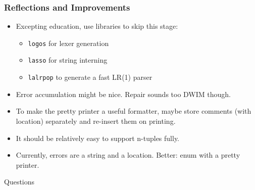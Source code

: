 \documentclass{beamer}
\begin{document}
\begin{frame}
    \frametitle{Reflections and Improvements}
    \begin{itemize}[<+(1)->]
        \item Excepting education, use libraries to skip this stage:
            \begin{itemize}[<+(1)->]
                \item \texttt{logos} for lexer generation
                \item \texttt{lasso} for string interning
                \item \texttt{lalrpop} to generate a fast LR(1) parser
            \end{itemize}
        \item Error accumulation might be nice. Repair sounds too DWIM though.
        \item To make the pretty printer a useful formatter, maybe store
            comments (with location) separately and re-insert them on printing.
        \item It should be relatively easy to support n-tuples fully. 
        \item Currently, errors are a string and a location. Better: enum with a
            pretty printer.
    \end{itemize}
\end{frame}

\begin{frame}[plain,c]
    \begin{center}
    \Huge{Questions}
    \end{center}
\end{frame}
\end{document}
